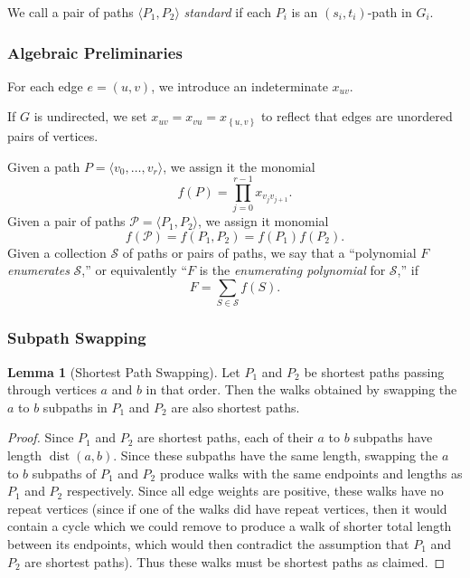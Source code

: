 \documentclass[11pt]{article}
\newcommand{\set}[1]{\left\{#1\right\}}
\DeclareMathOperator{\dist}{dist}
\newcommand{\ca}{\mathcal}
\theoremstyle{definition}
\newtheorem{lemma}[theorem]{Lemma}
\begin{document}
We call a pair of paths $\langle P_1,P_2\rangle$ \emph{standard} if each $P_i$ is an $(s_i,t_i)$-path in $G_i$.

\subsubsection*{Algebraic Preliminaries}

For each edge $e = (u,v)$, we introduce an indeterminate $x_{uv}$.

If $G$ is undirected, we set 
$x_{uv} = x_{vu} = x_{\set{u,v}}$
to reflect that edges are unordered pairs of vertices.

\noindent Given a path $P = \langle v_0, \dots, v_r\rangle $, we assign it the monomial
    \[f(P) = \prod_{j=0}^{r-1}x_{v_jv_{j+1}}.\]    
Given a pair of paths $\ca{P} = \langle P_1, P_2\rangle$, we assign it monomial 
    \[f(\ca{P}) = f(P_1,P_2) = f(P_1)f(P_2).\]
Given a collection $\ca{S}$ of paths or pairs of paths, we say that a ``polynomial $F$ \emph{enumerates} $\ca{S}$,'' or equivalently ``$F$ is the \emph{enumerating polynomial} for $\ca{S}$,'' if 
    \[F = \sum_{S\in \ca{S}} f(S).\]

\subsubsection*{Subpath Swapping}

\begin{lemma}[Shortest Path Swapping]
\label{preserve-shortest-paths}
    Let $P_1$ and $P_2$ be shortest paths passing through vertices $a$ and $b$ in that order.
    Then the walks obtained by swapping the $a$ to $b$ subpaths in $P_1$ and $P_2$ are also shortest paths.
\end{lemma}
\begin{proof}
Since $P_1$ and $P_2$ are shortest paths, each of their $a$ to $b$ subpaths have length $\dist(a,b)$.
Since these subpaths have the same length, swapping the $a$ to $b$ subpaths of $P_1$ and $P_2$ produce walks with the same endpoints and lengths as $P_1$ and $P_2$ respectively.
Since all edge weights are positive, these walks have no repeat vertices (since if one of the walks did have repeat vertices, then it would contain a cycle which we could remove to produce a walk of shorter total length between its endpoints, which would then contradict the assumption that $P_1$ and $P_2$ are shortest paths).
Thus these walks must be shortest paths as claimed.
\end{proof}
\end{document}
